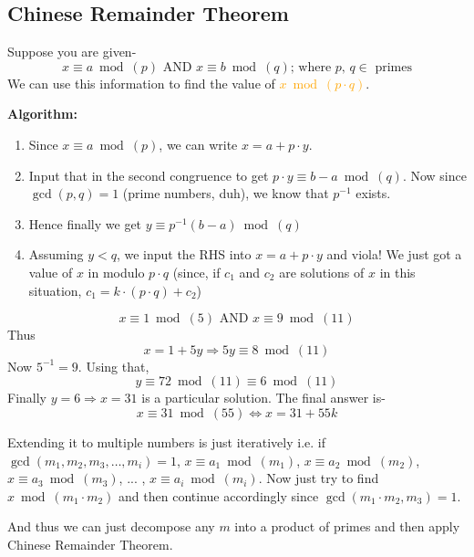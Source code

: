 		\begin{mdframed}
			\subsection{Chinese Remainder Theorem}\label{subsec:chinese}
				Suppose you are given- \[x \equiv a \bmod(p) \text{ AND } x \equiv b \bmod(q) \text{; where $p$, $q\in $ primes}\]
				We can use this information to find the value of \textcolor{orange}{\(x \bmod(p\cdot q)\)}. 
				
				\textbf{Algorithm:}
				\begin{enumerate}
					\item Since \(x\equiv a \bmod(p)\), we can write \(x = a + p \cdot y\).
					\item Input that in the second congruence to get \(p \cdot y \equiv b -a \bmod(q)\). Now since \(\gcd(p,q)=1\) (prime numbers, duh), we know that \(p^{-1}\) exists.
					\item Hence finally we get \(y \equiv p^{-1}(b-a)\bmod(q)\)
					\item Assuming \(y<q\), we input the RHS into \(x= a + p \cdot y\) and viola! We just got a value of \(x\) in modulo \(p\cdot q\) (since, if \(c_1\) and \(c_2\) are solutions of \(x\) in this situation, \(c_1 = k\cdot (p\cdot q) + c_2\))
				\end{enumerate}
				\begin{tcolorbox}[breakable, title=Illustration,colback=brown!5!white,colframe=brown!75!black,colbacktitle=yellow!50!red,coltitle=red!25!black,fonttitle=\bfseries,subtitle style={boxrule=0.4pt,colback=yellow!50!red!25!white} ]
					\[x\equiv 1 \bmod(5) \text{ AND } x \equiv 9 \bmod(11)\]
					Thus \[x = 1 + 5 y\Rightarrow 5 y \equiv 8 \bmod(11)\]
					Now \(5^{-1}=9\). Using that, \[y \equiv 72 \bmod(11)\equiv 6 \bmod(11)\]
					Finally \(y =6 \Rightarrow x = 31\) is a particular solution. The final answer is-\[x\equiv 31 \bmod(55) \Leftrightarrow x = 31 + 55k \]
				\end{tcolorbox}

				Extending it to multiple numbers is just iteratively i.e. if \(\gcd(m_1, m_2, m_3, \ldots, m_i)=1\), \(x\equiv a_1\bmod(m_1)\), \(x\equiv a_2\bmod(m_2)\), \(x\equiv a_3\bmod(m_3)\), ... , \(x\equiv a_i\bmod(m_i)\). Now just try to find \(x \bmod(m_1\cdot m_2)\) and then continue accordingly since \(\gcd(m_1\cdot m_2, m_3)=1\).
		\end{mdframed}

		And thus we can just decompose any \(m\) into a product of primes and then apply Chinese Remainder Theorem. 

